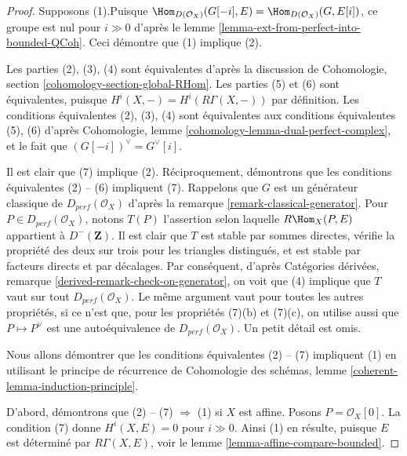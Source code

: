 \begin{proof}
Supposons (1).\newline Puisque
$\Hom_{D(\mathcal{O}_X)}(G[-i], E) = \Hom_{D(\mathcal{O}_X)}(G, E[i])$,
ce groupe est nul pour $i \gg 0$ d'après le
lemme \ref{lemma-ext-from-perfect-into-bounded-QCoh}. Ceci démontre
que (1) implique (2).

\medskip\noindent
Les parties (2), (3), (4) sont équivalentes d'après la discussion de
Cohomologie, section \ref{cohomology-section-global-RHom}.
Les parties (5) et (6) sont équivalentes, puisque $H^i(X, -) = H^i(R\Gamma(X, -))$
par définition. Les conditions équivalentes (2), (3), (4) sont
équivalentes aux conditions équivalentes (5), (6) d'après
Cohomologie, lemme \ref{cohomology-lemma-dual-perfect-complex},
et le fait que $(G[-i])^\vee = G^\vee[i]$.

\medskip\noindent
Il est clair que (7) implique (2). Réciproquement, 
démontrons que les conditions équivalentes (2) -- (6) impliquent (7).
Rappelons que $G$ est un générateur classique de $D_{perf}(\mathcal{O}_X)$ d'après la
remarque \ref{remark-classical-generator}.
Pour $P \in D_{perf}(\mathcal{O}_X)$, notons $T(P)$ l'assertion selon laquelle
$R\Hom_X(P, E)$ appartient à $D^-(\mathbf{Z})$.
Il est clair que $T$ est stable par sommes directes,
vérifie la propriété des deux sur trois pour les triangles
distingués, et est stable par facteurs directs et par décalages.
Par conséquent, d'après Catégories dérivées, remarque \ref{derived-remark-check-on-generator},
on voit que (4) implique que $T$ vaut sur tout $D_{perf}(\mathcal{O}_X)$.
Le même argument vaut pour toutes les autres propriétés, si ce n'est que, pour les propriétés
(7)(b) et (7)(c), on utilise aussi que $P \mapsto P^\vee$ est une
autoéquivalence de $D_{perf}(\mathcal{O}_X)$. Un petit détail est omis.

\medskip\noindent
Nous allons démontrer que les conditions équivalentes (2) -- (7) impliquent (1)
en utilisant le principe de récurrence de
Cohomologie des schémas, lemme \ref{coherent-lemma-induction-principle}.

\medskip\noindent
D'abord, démontrons que (2) -- (7) $\Rightarrow$ (1) si $X$ est affine.
Posons $P = \mathcal{O}_X[0]$. La condition (7) donne $H^i (X, E) = 0$ pour $i \gg 0$.
Ainsi (1) en résulte, puisque $E$ est déterminé par $R\Gamma (X, E)$,
voir le lemme \ref{lemma-affine-compare-bounded}.


\end{proof}
